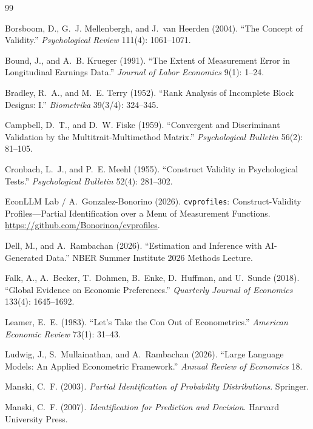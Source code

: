 \documentclass[11pt,letterpaper]{article}
\begin{document}
\begin{thebibliography}{99}
\small

Borsboom, D., G.~J. Mellenbergh, and J.~van Heerden (2004).
``The Concept of Validity.'' \textit{Psychological Review} 111(4): 1061--1071.

Bound, J., and A.~B. Krueger (1991).
``The Extent of Measurement Error in Longitudinal Earnings Data.''
\textit{Journal of Labor Economics} 9(1): 1--24.

Bradley, R.~A., and M.~E. Terry (1952).
``Rank Analysis of Incomplete Block Designs: I.'' \textit{Biometrika} 39(3/4): 324--345.

Campbell, D.~T., and D.~W. Fiske (1959).
``Convergent and Discriminant Validation by the Multitrait-Multimethod Matrix.''
\textit{Psychological Bulletin} 56(2): 81--105.

Cronbach, L.~J., and P.~E. Meehl (1955).
``Construct Validity in Psychological Tests.'' \textit{Psychological Bulletin} 52(4): 281--302.

EconLLM Lab / A.~Gonzalez-Bonorino (2026).
\texttt{cvprofiles}: Construct-Validity Profiles---Partial Identification over a Menu of Measurement
Functions. \url{https://github.com/Bonorinoa/cvprofiles}.

Dell, M., and A.~Rambachan (2026).
``Estimation and Inference with AI-Generated Data.''
NBER Summer Institute 2026 Methods Lecture.

Falk, A., A.~Becker, T.~Dohmen, B.~Enke, D.~Huffman, and U.~Sunde (2018).
``Global Evidence on Economic Preferences.''
\textit{Quarterly Journal of Economics} 133(4): 1645--1692.

Leamer, E.~E. (1983).
``Let's Take the Con Out of Econometrics.'' \textit{American Economic Review} 73(1): 31--43.

Ludwig, J., S.~Mullainathan, and A.~Rambachan (2026).
``Large Language Models: An Applied Econometric Framework.''
\textit{Annual Review of Economics} 18.

Manski, C.~F. (2003). \textit{Partial Identification of Probability Distributions}. Springer.

Manski, C.~F. (2007). \textit{Identification for Prediction and Decision}. Harvard University Press.


\end{thebibliography}
\end{document}
